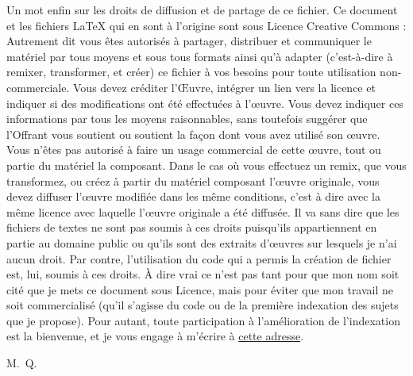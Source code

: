 Un mot enfin sur les droits de diffusion et de partage de ce fichier. Ce document et les fichiers \LaTeX{} qui
en sont à l'origine sont sous Licence Creative Commons : \doclicenseLongText{} Autrement dit vous êtes autorisés
à partager, distribuer et communiquer le matériel par tous moyens et sous tous formats ainsi qu'à adapter 
(c'est-à-dire à remixer, transformer, et créer) ce fichier à vos besoins pour toute utilisation non-commerciale.
Vous devez créditer l'Œuvre, intégrer un lien vers la licence et indiquer si des modifications ont été effectuées à
l'œuvre. Vous devez indiquer ces informations par tous les moyens raisonnables, sans toutefois suggérer que l'Offrant vous
soutient ou soutient la façon dont vous avez utilisé son œuvre. Vous n'êtes pas autorisé à faire un usage commercial de
cette œuvre, tout ou partie du matériel la composant. Dans le cas où vous effectuez un remix, que vous
transformez, ou créez à partir du matériel composant l'œuvre originale, vous devez diffuser l'œuvre modifiée dans les même
conditions, c'est à dire avec la même licence avec laquelle l'œuvre originale a été diffusée. Il va sans dire que les
fichiers de textes ne sont pas soumis à ces droits puisqu'ils appartiennent en partie au domaine public ou qu'ils sont des extraits d'œuvres sur lesquels je n'ai aucun droit. Par contre, l'utilisation du
code qui a permis la création de fichier est, lui, soumis à ces droits. À dire vrai ce n'est pas tant pour que mon
nom soit cité que je mets ce document sous Licence, mais pour éviter que mon travail ne soit commercialisé (qu'il
s'agisse du code ou de la première indexation des sujets que je propose). Pour autant, toute participation à 
l'amélioration de l'indexation est la bienvenue, et je vous engage à m'écrire à 
\href{mailto:mikael.quesseveur@ac-lille.fr}{cette adresse}.

\begin{flushright}M.~Q.\end{flushright}

\vfill{~}

\doclicenseImage